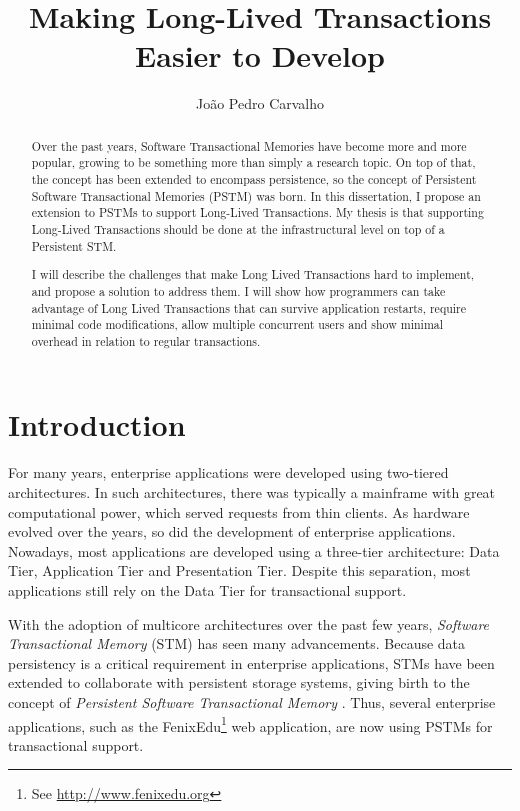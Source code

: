 \documentclass{llncs}
\begin{document}
\title{Making Long-Lived Transactions Easier to Develop}

\author{Jo\~{a}o Pedro Carvalho} 
\maketitle


\begin{abstract}

Over the past years, Software Transactional Memories have become more
and more popular, growing to be something more than simply a research
topic. On top of that, the concept has been extended to encompass
persistence, so the concept of Persistent Software Transactional
Memories (PSTM) was born. In this dissertation, I propose an extension
to PSTMs to support Long-Lived Transactions. My thesis is that
supporting Long-Lived Transactions should be done at the
infrastructural level on top of a Persistent STM.

I will describe the challenges that make Long Lived Transactions hard
to implement, and propose a solution to address them. I will show how
programmers can take advantage of Long Lived Transactions that can
survive application restarts, require minimal code modifications,
allow multiple concurrent users and show minimal overhead in relation
to regular transactions.
\end{abstract}


\section{Introduction}

For many years, enterprise applications were developed using
two-tiered architectures. In such architectures, there was typically a
mainframe with great computational power, which served requests from
thin clients. As hardware evolved over the years, so did the
development of enterprise applications. Nowadays, most applications
are developed using a three-tier architecture: Data Tier, Application
Tier and Presentation Tier. Despite this separation, most applications
still rely on the Data Tier for transactional support.

With the adoption of multicore architectures over the past few years,
{\it Software Transactional Memory} (STM) has seen many advancements.
Because data persistency is a critical requirement in enterprise
applications, STMs have been extended to collaborate with persistent
storage systems, giving birth to the concept of {\it Persistent
  Software Transactional Memory} \cite{fernandes2011strict}. Thus,
several enterprise applications, such as the FenixEdu\footnote{See
  \url{http://www.fenixedu.org}} web application, are now using
PSTMs for transactional support.
\end{document}
